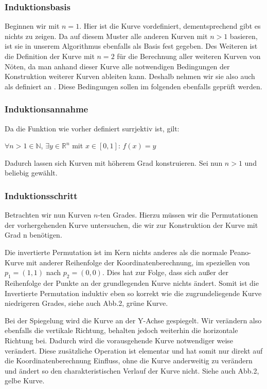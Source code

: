 \documentclass[course=asp]{aspdoc}
\begin{document}
\subsubsection{Induktionsbasis}
Beginnen wir mit $n = 1$. Hier ist die Kurve vordefiniert, dementsprechend gibt es nichts zu zeigen. Da auf diesem Muster alle anderen Kurven mit $n > 1$ basieren, ist sie in unserem Algorithmus ebenfalls als Basis fest gegeben.
Des Weiteren ist die Definition der Kurve mit $n = 2$ für die Berechnung aller weiteren Kurven von Nöten, da man anhand dieser Kurve alle notwendigen Bedingungen der Konstruktion weiterer Kurven ableiten kann. Deshalb nehmen wir sie also auch als definiert an \cite{aufgabenstellung}. Diese Bedingungen sollen im folgenden ebenfalls geprüft werden.

\subsubsection{Induktionsannahme}
Da die Funktion wie vorher definiert surrjektiv ist, gilt:

\begin{center}
$\forall n > 1 \in \mathbb{N}$, $\exists y \in \mathbb{R}^n$ mit $x \in [0,1]$: $f(x)= y$	%
\end{center}

Dadurch lassen sich Kurven mit höherem Grad konstruieren. Sei nun $n > 1$ und beliebig gewählt.

\subsubsection{Induktionsschritt}
Betrachten wir nun Kurven $n$-ten Grades. Hierzu müssen wir die Permutationen der vorhergehenden Kurve untersuchen, die wir zur Konstruktion der Kurve mit Grad n benötigen.	

Die invertierte Permutation ist im Kern nichts anderes als die normale Peano-Kurve mit anderer Reihenfolge der Koordinatenberechnung, im speziellen von $p_1=(1,1)$ nach $p_2 = (0,0)$. Dies hat zur Folge, dass sich außer der Reihenfolge der Punkte an der grundlegenden Kurve nichts ändert. Somit ist die Invertierte Permutation induktiv eben so korrekt wie die zugrundeliegende Kurve niedrigeren Grades, siehe auch Abb.2, grüne Kurve.

Bei der Spiegelung wird die Kurve an der Y-Achse gespiegelt. Wir verändern also ebenfalls die vertikale Richtung, behalten jedoch weiterhin die horizontale Richtung bei. Dadurch wird die vorausgehende Kurve notwendiger weise verändert. Diese zusätzliche Operation ist elementar und hat somit nur direkt auf die Koordinatenberechnung Einfluss, ohne die Kurve anderweitig zu verändern und ändert so den charakteristischen Verlauf der Kurve nicht. Siehe auch Abb.2, gelbe Kurve.
\end{document}
